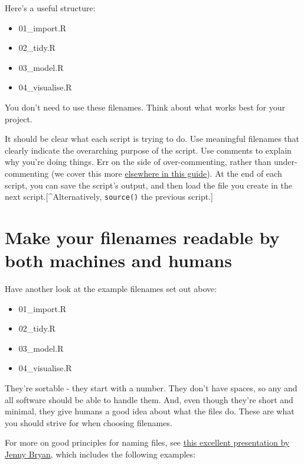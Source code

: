 \documentclass[]{book}
\providecommand{\tightlist}{%
  \setlength{\itemsep}{0pt}\setlength{\parskip}{0pt}}
\begin{document}
Here's a useful structure:

\begin{itemize}
\tightlist
\item
  01\_import.R
\item
  02\_tidy.R
\item
  03\_model.R
\item
  04\_visualise.R
\end{itemize}

You don't need to use these filenames. Think about what works best for your project.

It should be clear what each script is trying to do. Use meaningful filenames that clearly indicate the overarching purpose of the script. Use comments to explain why you're doing things. Err on the side of over-commenting, rather than under-commenting (we cover this more \protect\hyperlink{use-comments}{elsewhere in this guide}). At the end of each script, you can save the script's output, and then load the file you create in the next script.{[}\^{}Alternatively, \texttt{source()} the previous script.{]}

\hypertarget{make-your-filenames-readable-by-both-machines-and-humans}{%
\section{Make your filenames readable by both machines and humans}\label{make-your-filenames-readable-by-both-machines-and-humans}}

Have another look at the example filenames set out above:

\begin{itemize}
\tightlist
\item
  01\_import.R
\item
  02\_tidy.R
\item
  03\_model.R
\item
  04\_visualise.R
\end{itemize}

They're sortable - they start with a number. They don't have spaces, so any and all software should be able to handle them. And, even though they're short and minimal, they give humans a good idea about what the files do. These are what you should strive for when choosing filenames.

For more on good principles for naming files, see \href{https://speakerdeck.com/jennybc/how-to-name-files}{this excellent presentation by Jenny Bryan}, which includes the following examples:
\end{document}
